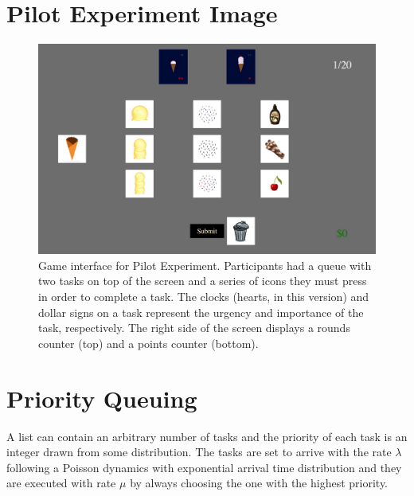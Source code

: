 \documentclass[
]{report}
\begin{document}
\hypertarget{pilot-experiment-image}{%
\section{Pilot Experiment Image}\label{pilot-experiment-image}}

\begin{figure}

{\centering \includegraphics{images/totalice.jpeg}

}

\caption{\label{fig-pilot-exp}Game interface for Pilot Experiment.
Participants had a queue with two tasks on top of the screen and a
series of icons they must press in order to complete a task. The clocks
(hearts, in this version) and dollar signs on a task represent the
urgency and importance of the task, respectively. The right side of the
screen displays a rounds counter (top) and a points counter (bottom).}

\end{figure}

\newpage{}

\hypertarget{priority-queuing-1}{%
\section{Priority Queuing}\label{priority-queuing-1}}

A list can contain an arbitrary number of tasks and the priority of each
task is an integer drawn from some distribution. The tasks are set to
arrive with the rate \(\lambda\) following a Poisson dynamics with
exponential arrival time distribution and they are executed with rate
\(\mu\) by always choosing the one with the highest priority.
\end{document}

